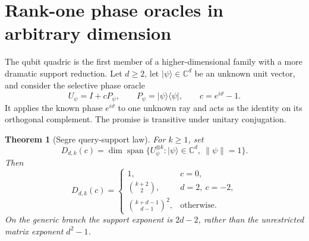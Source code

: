 \documentclass[11pt]{article}
\newtheorem{theorem}{Theorem}[section]
\theoremstyle{definition}
\theoremstyle{remark}
\newcommand{\C}{\mathbb C}
\newcommand{\Span}{\operatorname{span}}
\newcommand{\ket}[1]{\lvert #1\rangle}
\newcommand{\bra}[1]{\langle #1\rvert}
\begin{document}
\section{Rank-one phase oracles in arbitrary dimension}

The qubit quadric is the first member of a higher-dimensional family with a
more dramatic support reduction.  Let $d\geq2$, let $\ket\psi\in\C^d$ be an
unknown unit vector, and consider the selective phase oracle
\begin{equation}\label{eq:phaseoracle}
 U_\psi=I+cP_\psi,\qquad
 P_\psi=\ket\psi\!\bra\psi,\qquad c=e^{i\vartheta}-1.
\end{equation}
It applies the known phase $e^{i\vartheta}$ to one unknown ray and acts as the
identity on its orthogonal complement.  The promise is transitive under
unitary conjugation.

\begin{theorem}[Segre query-support law]\label{thm:segre}
For $k\geq1$, set
\begin{equation}
 D_{d,k}(c)=\dim\Span\{U_\psi^{\otimes k}:\ket\psi\in\C^d,\ \|\psi\|=1\}.
\end{equation}
Then
\begin{equation}\label{eq:segrerank}
 D_{d,k}(c)=
 \begin{cases}
 1,&c=0,\\[1mm]
 \binom{k+2}{2},&d=2,\ c=-2,\\[2mm]
 \binom{k+d-1}{d-1}^{\!2},&\text{otherwise}.
 \end{cases}
\end{equation}
On the generic branch the support exponent is $2d-2$, rather than the
unrestricted matrix exponent $d^2-1$.
\end{theorem}
\end{document}
